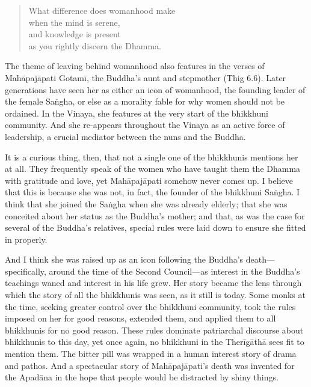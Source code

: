 \documentclass[12pt,openany]{book}%
\begin{document}
\begin{quotation}%
What difference does womanhood make\\

when the mind is serene,\\

and knowledge is present\\

as you rightly discern the Dhamma.

%
\end{quotation}

The theme of leaving behind womanhood also features in the verses of \textsanskrit{Mahāpajāpati} \textsanskrit{Gotamī}, the Buddha’s aunt and stepmother (Thig 6.6). Later generations have seen her as either an icon of womanhood, the founding leader of the female \textsanskrit{Saṅgha}, or else as a morality fable for why women should not be ordained. In the Vinaya, she features at the very start of the bhikkhuni community. And she re-appears throughout the Vinaya as an active force of leadership, a crucial mediator between the nuns and the Buddha.

It is a curious thing, then, that not a single one of the bhikkhunis mentions her at all. They frequently speak of the women who have taught them the Dhamma with gratitude and love, yet \textsanskrit{Mahāpajāpati} somehow never comes up. I believe that this is because she was not, in fact, the founder of the bhikkhuni \textsanskrit{Saṅgha}. I think that she joined the \textsanskrit{Saṅgha} when she was already elderly; that she was conceited about her status as the Buddha’s mother; and that, as was the case for several of the Buddha’s relatives, special rules were laid down to ensure she fitted in properly.

And I think she was raised up as an icon following the Buddha’s death—specifically, around the time of the Second Council—as interest in the Buddha’s teachings waned and interest in his life grew. Her story became the lens through which the story of all the bhikkhunis was seen, as it still is today. Some monks at the time, seeking greater control over the bhikkhuni community, took the rules imposed on her for good reasons, extended them, and applied them to all bhikkhunis for no good reason. These rules dominate patriarchal discourse about bhikkhunis to this day, yet once again, no bhikkhuni in the \textsanskrit{Therīgāthā} sees fit to mention them. The bitter pill was wrapped in a human interest story of drama and pathos. And a spectacular story of \textsanskrit{Mahāpajāpati}’s death was invented for the \textsanskrit{Apadāna} in the hope that people would be distracted by shiny things.
\end{document}
